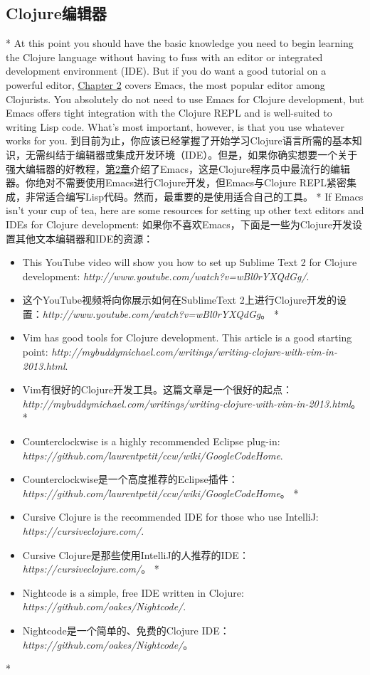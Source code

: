 \begin{paracol}{2}
\section{Clojure编辑器}
\switchcolumn[0]*
At this point you should have the basic knowledge you need to begin
learning the Clojure language without having to fuss with an editor or
integrated development environment (IDE). But if you do want a good
tutorial on a powerful editor, \href{javascript:void(0)}{Chapter 2}
covers Emacs, the most popular editor among Clojurists. You absolutely
do not need to use Emacs for Clojure development, but Emacs offers tight
integration with the Clojure REPL and is well-suited to writing Lisp
code. What's most important, however, is that you use whatever works for
you.
\switchcolumn
到目前为止，你应该已经掌握了开始学习Clojure语言所需的基本知识，无需纠结于编辑器或集成开发环境（IDE）。但是，如果你确实想要一个关于强大编辑器的好教程，\href{javascript:void(0)}{第2章}介绍了Emacs，这是Clojure程序员中最流行的编辑器。你绝对不需要使用Emacs进行Clojure开发，但Emacs与Clojure REPL紧密集成，非常适合编写Lisp代码。然而，最重要的是使用适合自己的工具。
\switchcolumn[0]*
If Emacs isn't your cup of tea, here are some resources for setting up
other text editors and IDEs for Clojure development:
\switchcolumn
如果你不喜欢Emacs，下面是一些为Clojure开发设置其他文本编辑器和IDE的资源：

\begin{itemize}
\switchcolumn[0]*
\item This YouTube video will show you how to set up Sublime Text 2 for
Clojure development: \emph{http://www.youtube.com/watch?v=wBl0rYXQdGg/}.
\switchcolumn
\item  这个YouTube视频将向你展示如何在SublimeText 2上进行Clojure开发的设置：\emph{http://www.youtube.com/watch?v=wBl0rYXQdGg}。
\switchcolumn[0]*
\item Vim has good tools for Clojure development. This article is a good
starting point:
\emph{http://mybuddymichael.com/writings/writing-clojure-with-vim-in-2013.html}.
\switchcolumn
\item Vim有很好的Clojure开发工具。这篇文章是一个很好的起点：\emph{http://mybuddymichael.com/writings/writing-clojure-with-vim-in-2013.html}。
\switchcolumn[0]*
\item Counterclockwise is a highly recommended Eclipse plug-in:
\emph{https://github.com/laurentpetit/ccw/wiki/GoogleCodeHome}.
\switchcolumn
\item Counterclockwise是一个高度推荐的Eclipse插件：\emph{https://github.com/laurentpetit/ccw/wiki/GoogleCodeHome}。
\switchcolumn[0]*
\item Cursive Clojure is the recommended IDE for those who use IntelliJ:
\emph{https://cursiveclojure.com/}.
\switchcolumn
\item Cursive Clojure是那些使用IntelliJ的人推荐的IDE：\emph{https://cursiveclojure.com/}。
\switchcolumn[0]*
\item Nightcode is a simple, free IDE written in Clojure:
\emph{https://github.com/oakes/Nightcode/}.
\switchcolumn
\item Nightcode是一个简单的、免费的Clojure IDE：\emph{https://github.com/oakes/Nightcode/}。
\end{itemize}
\switchcolumn[0]*


\end{paracol}
